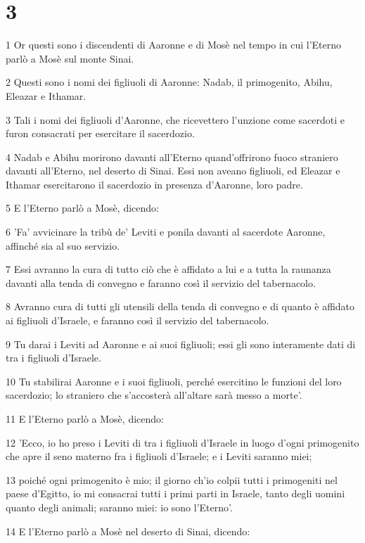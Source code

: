 \chapter{3}

\par 1 Or questi sono i discendenti di Aaronne e di Mosè nel tempo in cui l'Eterno parlò a Mosè sul monte Sinai.
\par 2 Questi sono i nomi dei figliuoli di Aaronne: Nadab, il primogenito, Abihu, Eleazar e Ithamar.
\par 3 Tali i nomi dei figliuoli d'Aaronne, che ricevettero l'unzione come sacerdoti e furon consacrati per esercitare il sacerdozio.
\par 4 Nadab e Abihu morirono davanti all'Eterno quand'offrirono fuoco straniero davanti all'Eterno, nel deserto di Sinai. Essi non aveano figliuoli, ed Eleazar e Ithamar esercitarono il sacerdozio in presenza d'Aaronne, loro padre.
\par 5 E l'Eterno parlò a Mosè, dicendo:
\par 6 'Fa' avvicinare la tribù de' Leviti e ponila davanti al sacerdote Aaronne, affinché sia al suo servizio.
\par 7 Essi avranno la cura di tutto ciò che è affidato a lui e a tutta la raunanza davanti alla tenda di convegno e faranno così il servizio del tabernacolo.
\par 8 Avranno cura di tutti gli utensili della tenda di convegno e di quanto è affidato ai figliuoli d'Israele, e faranno così il servizio del tabernacolo.
\par 9 Tu darai i Leviti ad Aaronne e ai suoi figliuoli; essi gli sono interamente dati di tra i figliuoli d'Israele.
\par 10 Tu stabilirai Aaronne e i suoi figliuoli, perché esercitino le funzioni del loro sacerdozio; lo straniero che s'accosterà all'altare sarà messo a morte'.
\par 11 E l'Eterno parlò a Mosè, dicendo:
\par 12 'Ecco, io ho preso i Leviti di tra i figliuoli d'Israele in luogo d'ogni primogenito che apre il seno materno fra i figliuoli d'Israele; e i Leviti saranno miei;
\par 13 poiché ogni primogenito è mio; il giorno ch'io colpii tutti i primogeniti nel paese d'Egitto, io mi consacrai tutti i primi parti in Israele, tanto degli uomini quanto degli animali; saranno miei: io sono l'Eterno'.
\par 14 E l'Eterno parlò a Mosè nel deserto di Sinai, dicendo:
